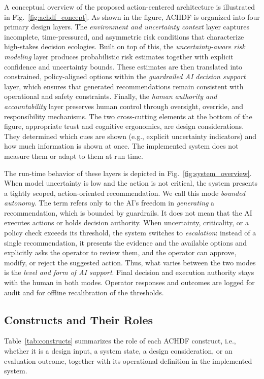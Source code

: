 \documentclass[journal]{IEEEtran}
\theoremstyle{plain}
\theoremstyle{definition}
\begin{document}
    A conceptual overview of the proposed action-centered architecture is illustrated in Fig.~\ref{fig:achdf_concept}.
As shown in the figure, ACHDF is organized into four primary design layers. The \emph{environment and uncertainty context} layer captures incomplete, time-pressured, and asymmetric risk conditions that characterize high-stakes decision ecologies. Built on top of this, the \emph{uncertainty-aware risk modeling} layer produces probabilistic risk estimates together with explicit confidence and uncertainty bounds. These estimates are then translated into constrained, policy-aligned options within the \emph{guardrailed AI decision support} layer, which ensures that generated recommendations remain consistent with operational and safety constraints. Finally, the \emph{human authority and accountability} layer preserves human control through oversight, override, and responsibility mechanisms. The two cross-cutting elements at the bottom of the figure, appropriate trust and cognitive ergonomics, are design considerations. They determined which cues are shown (e.g., explicit uncertainty indicators) and how much information is shown at once. The implemented system does not measure them or adapt to them at run time.

The run-time behavior of these layers is depicted in Fig.~\ref{fig:system_overview}.
When model uncertainty is low and the action is not critical, the system presents a tightly scoped, action-oriented recommendation. We call this mode \emph{bounded autonomy}. The term refers only to the AI's freedom in \emph{generating} a recommendation, which is bounded by guardrails. It does not mean that the AI executes actions or holds decision authority. When uncertainty, criticality, or a policy check exceeds its threshold, the system switches to \emph{escalation}: instead of a single recommendation, it presents the evidence and the available options and explicitly asks the operator to review them, and the operator can approve, modify, or reject the suggested action. Thus, what varies between the two modes is the \emph{level and form of AI support}. Final decision and execution authority stays with the human in both modes. Operator responses and outcomes are logged for audit and for offline recalibration of the thresholds.

    \subsection{Constructs and Their Roles}
    \label{sec:constructs}
    Table~\ref{tab:constructs} summarizes the role of each ACHDF construct, i.e., whether it is a design input, a system state, a design consideration, or an evaluation outcome, together with its operational definition in the implemented system.
\end{document}

